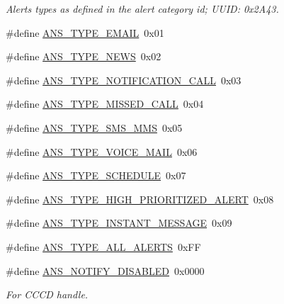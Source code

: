 \begin{DoxyCompactItemize}
\begin{DoxyCompactList}\small\item\em Alerts types as defined in the alert category id; U\+U\+ID\+: 0x2\+A43. \end{DoxyCompactList}\item 
\#define \hyperlink{group___b_l_e___a_n_s_ga9de840c4fb14c7589971efdfb8bf24af}{A\+N\+S\+\_\+\+T\+Y\+P\+E\+\_\+\+E\+M\+A\+IL}~0x01
\item 
\#define \hyperlink{group___b_l_e___a_n_s_gad6e2761ace422cc7ade00258324c831c}{A\+N\+S\+\_\+\+T\+Y\+P\+E\+\_\+\+N\+E\+WS}~0x02
\item 
\#define \hyperlink{group___b_l_e___a_n_s_gadcf6dc95a38de6b6a02e424f1b75f079}{A\+N\+S\+\_\+\+T\+Y\+P\+E\+\_\+\+N\+O\+T\+I\+F\+I\+C\+A\+T\+I\+O\+N\+\_\+\+C\+A\+LL}~0x03
\item 
\#define \hyperlink{group___b_l_e___a_n_s_ga58d9a9b1c09db4a406c5db67678bb963}{A\+N\+S\+\_\+\+T\+Y\+P\+E\+\_\+\+M\+I\+S\+S\+E\+D\+\_\+\+C\+A\+LL}~0x04
\item 
\#define \hyperlink{group___b_l_e___a_n_s_ga3209f94c5ea3bde1aa53e124e6f61d92}{A\+N\+S\+\_\+\+T\+Y\+P\+E\+\_\+\+S\+M\+S\+\_\+\+M\+MS}~0x05
\item 
\#define \hyperlink{group___b_l_e___a_n_s_ga214c6aa840e7630ffb9c26c30f0c2e8b}{A\+N\+S\+\_\+\+T\+Y\+P\+E\+\_\+\+V\+O\+I\+C\+E\+\_\+\+M\+A\+IL}~0x06
\item 
\#define \hyperlink{group___b_l_e___a_n_s_ga03b13be471f94f0187c9d0dc7b2496a3}{A\+N\+S\+\_\+\+T\+Y\+P\+E\+\_\+\+S\+C\+H\+E\+D\+U\+LE}~0x07
\item 
\#define \hyperlink{group___b_l_e___a_n_s_gacd78058e8f257b8e5fbfaaf675163f07}{A\+N\+S\+\_\+\+T\+Y\+P\+E\+\_\+\+H\+I\+G\+H\+\_\+\+P\+R\+I\+O\+R\+I\+T\+I\+Z\+E\+D\+\_\+\+A\+L\+E\+RT}~0x08
\item 
\#define \hyperlink{group___b_l_e___a_n_s_ga87722a5078474bb2431b5021f228b67b}{A\+N\+S\+\_\+\+T\+Y\+P\+E\+\_\+\+I\+N\+S\+T\+A\+N\+T\+\_\+\+M\+E\+S\+S\+A\+GE}~0x09
\item 
\#define \hyperlink{group___b_l_e___a_n_s_ga184b6374fa7c99f508a87f91391a0418}{A\+N\+S\+\_\+\+T\+Y\+P\+E\+\_\+\+A\+L\+L\+\_\+\+A\+L\+E\+R\+TS}~0x\+FF
\item 
\#define \hyperlink{group___b_l_e___a_n_s_gacb56a8a8ddb2833bee263b4b5b41c091}{A\+N\+S\+\_\+\+N\+O\+T\+I\+F\+Y\+\_\+\+D\+I\+S\+A\+B\+L\+ED}~0x0000
\begin{DoxyCompactList}\small\item\em For C\+C\+CD handle. \end{DoxyCompactList}\item 

\end{DoxyCompactItemize}
